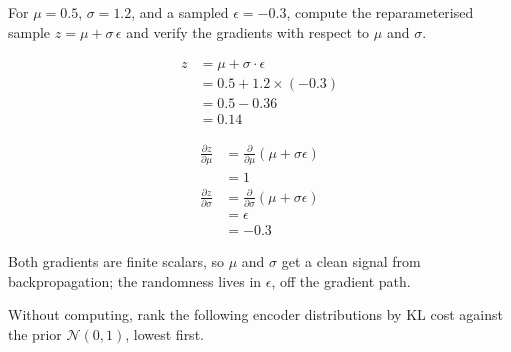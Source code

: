 

\vspace{2.5em}


For $\mu{=}0.5$, $\sigma{=}1.2$, and a sampled $\epsilon{=}-0.3$, compute the reparameterised sample $z = \mu + \sigma\, \epsilon$ and verify the gradients with respect to $\mu$ and $\sigma$.

\begin{align*}
    z &= \mu + \sigma \cdot \epsilon \\
      &= 0.5 + 1.2 \times (-0.3) \\
      &= 0.5 - 0.36 \\
      &= 0.14
\end{align*}

\begin{align*}
    \frac{\partial z}{\partial \mu}    &= \frac{\partial}{\partial \mu}(\mu + \sigma \epsilon) \\
                                       &= 1 \\[4pt]
    \frac{\partial z}{\partial \sigma} &= \frac{\partial}{\partial \sigma}(\mu + \sigma \epsilon) \\
                                       &= \epsilon \\
                                       &= -0.3
\end{align*}

Both gradients are finite scalars, so $\mu$ and $\sigma$ get a clean signal from backpropagation; the randomness lives in $\epsilon$, off the gradient path.

\vspace{2.5em}


Without computing, rank the following encoder distributions by KL cost against the prior $\mathcal{N}(0, 1)$, lowest first.


